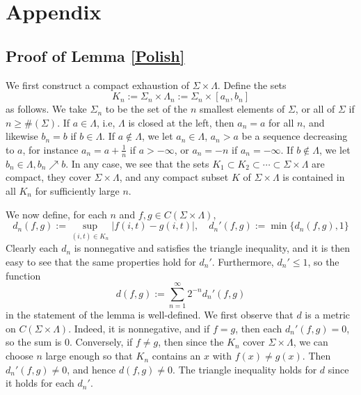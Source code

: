 %

\section{Appendix}

\subsection{Proof of Lemma \ref{Polish}}

We first construct a compact exhaustion of $\Sigma\times\Lambda$. Define the sets
\[
K_n := \Sigma_n \times \Lambda_n := \Sigma_n \times [a_n,b_n]
\]
as follows. We take $\Sigma_n$ to be the set of the $n$ smallest elements of $\Sigma$, or all of $\Sigma$ if $n\geq \#(\Sigma)$. If $a\in\Lambda$, i.e, $\Lambda$ is closed at the left, then $a_n=a$ for all $n$, and likewise $b_n=b$ if $b\in\Lambda$. If $a\notin\Lambda$, we let $a_n\in\Lambda$, $a_n>a$ be a sequence decreasing to $a$, for instance $a_n=a+\frac{1}{n}$ if $a>-\infty$, or $a_n=-n$ if $a_n=-\infty$. If $b\notin\Lambda$, we let $b_n\in\Lambda, b_n\nearrow b$. In any case, we see that the sets $K_1\subset K_2\subset\cdots\subset\Sigma\times\Lambda$ are compact, they cover $\Sigma\times\Lambda$, and any compact subset $K$ of $\Sigma\times\Lambda$ is contained in all $K_n$ for sufficiently large $n$.

We now define, for each $n$ and $f,g\in C(\Sigma\times\Lambda)$,
\[
d_n(f,g) := \sup_{(i,t)\in K_n} |f(i,t)-g(i,t)|,\quad d_n'(f,g) := \min\{d_n(f,g), 1\} 
\]
Clearly each $d_n$ is nonnegative and satisfies the triangle inequality, and it is then easy to see that the same properties hold for $d_n'$. Furthermore, $d_n'\leq 1$, so the function
\[
d(f,g) := \sum_{n=1}^\infty 2^{-n} d_n'(f,g)
\]
in the statement of the lemma is well-defined. We first observe that $d$ is a metric on $C(\Sigma\times\Lambda)$. Indeed, it is nonnegative, and if $f=g$, then each $d_n'(f,g)=0$, so the sum is 0. Conversely, if $f\neq g$, then since the $K_n$ cover $\Sigma\times\Lambda$, we can choose $n$ large enough so that $K_n$ contains an $x$ with $f(x)\neq g(x)$. Then $d_n'(f,g)\neq 0$, and hence $d(f,g)\neq 0$. The triangle inequality holds for $d$ since it holds for each $d_n'$.

